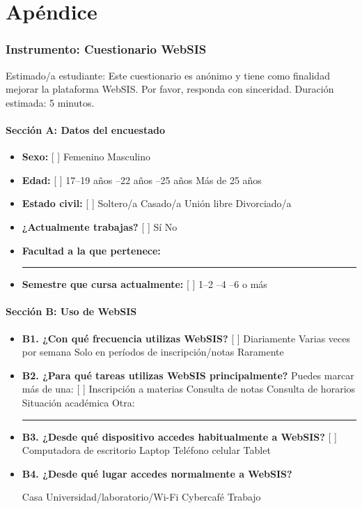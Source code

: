 \appendix
{}
\section*{\centering Apéndice \thesection}\label{apx:cuestionario}

\subsubsection*{Instrumento: Cuestionario WebSIS}

Estimado/a estudiante: Este cuestionario es anónimo y tiene como finalidad mejorar la plataforma WebSIS. Por favor, responda con sinceridad. Duración estimada: 5 minutos.

\paragraph{Sección A: Datos del encuestado}
\begin{itemize}
  \item \textbf{Sexo:} [ ] Femenino \quad [ ] Masculino
  \item \textbf{Edad:} [ ] 17--19 años --22 años --25 años \quad [ ] Más de 25 años
  \item \textbf{Estado civil:} [ ] Soltero/a \quad [ ] Casado/a \quad [ ] Unión libre \quad [ ] Divorciado/a
  \item \textbf{¿Actualmente trabajas?} [ ] Sí \quad [ ] No
  \item \textbf{Facultad a la que pertenece:} \rule{6cm}{0.4pt}
  \item \textbf{Semestre que cursa actualmente:} [ ] 1--2 --4 --6  o más
\end{itemize}

\paragraph{Sección B: Uso de WebSIS}
\begin{itemize}
  \item \textbf{B1. ¿Con qué frecuencia utilizas WebSIS?} [ ] Diariamente \quad [ ] Varias veces por semana \quad [ ] Solo en períodos de inscripción/notas \quad [ ] Raramente
  \item \textbf{B2. ¿Para qué tareas utilizas WebSIS principalmente?} Puedes marcar más de una: [ ] Inscripción a materias \quad [ ] Consulta de notas \quad [ ] Consulta de horarios \quad [ ] Situación académica \quad [ ] Otra: \rule{2cm}{0.4pt}
  \item \textbf{B3. ¿Desde qué dispositivo accedes habitualmente a WebSIS?} [ ] Computadora de escritorio \quad [ ] Laptop \quad [ ] Teléfono celular \quad [ ] Tablet
  \item \textbf{B4. ¿Desde qué lugar accedes normalmente a WebSIS?} \par [ ] Casa \quad [ ] Universidad/laboratorio/Wi-Fi \quad [ ] Cybercafé \quad [ ] Trabajo
\end{itemize}

